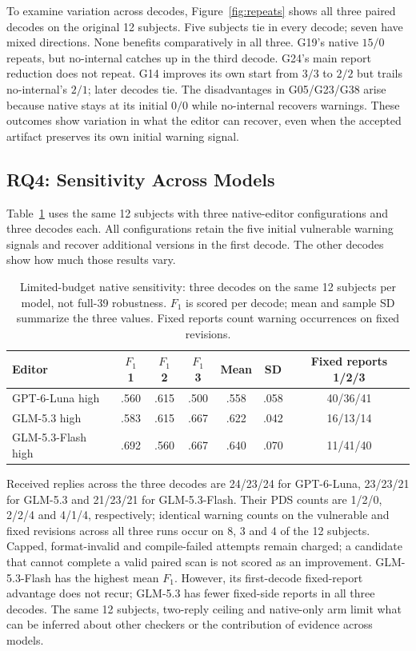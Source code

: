 To examine variation across decodes, Figure~\ref{fig:repeats} shows all three paired decodes on the original 12 subjects.
Five subjects tie in every decode; seven have mixed directions.
None benefits comparatively in all three.
G19's native $15/0$ repeats, but no-internal catches up in the third decode.
G24's main report reduction does not repeat.
G14 improves its own start from $3/3$ to $2/2$ but trails no-internal's $2/1$; later decodes tie.
The disadvantages in G05/G23/G38 arise because native stays at its initial $0/0$ while no-internal recovers warnings.
These outcomes show variation in what the editor can recover, even when the accepted artifact preserves its own initial warning signal.

\subsection{RQ4: Sensitivity Across Models}

Table~\ref{tab:models39} uses the same 12 subjects with three native-editor configurations and three decodes each.
All configurations retain the five initial vulnerable warning signals and recover additional versions in the first decode.
The other decodes show how much those results vary.

\begin{table}[!htbp]
\centering
\caption{Limited-budget native sensitivity: three decodes on the same 12 subjects per model, not full-39 robustness. $F_1$ is scored per decode; mean and sample SD summarize the three values. Fixed reports count warning occurrences on fixed revisions.}
\label{tab:models39}
\begingroup\FTTableSetup
\begin{tabular}{l|ccc|cc|c}
\hline\hline
\rule{0pt}{10.2bp}Editor & $F_1$ 1 & $F_1$ 2 & $F_1$ 3 & Mean & SD & Fixed reports 1/2/3\\
\hline
GPT-6-Luna high &.560&.615&.500&.558&.058&40/36/41\\\hline
GLM-5.3 high &.583&.615&.667&.622&.042&16/13/14\\\hline
GLM-5.3-Flash high &.692&.560&.667&.640&.070&11/41/40\\
\hline\hline
\end{tabular}
\endgroup
\end{table}

Received replies across the three decodes are 24/23/24 for GPT-6-Luna, 23/23/21 for GLM-5.3 and 21/23/21 for GLM-5.3-Flash.
Their PDS counts are 1/2/0, 2/2/4 and 4/1/4, respectively; identical warning counts on the vulnerable and fixed revisions across all three runs occur on 8, 3 and 4 of the 12 subjects.
Capped, format-invalid and compile-failed attempts remain charged; a candidate that cannot complete a valid paired scan is not scored as an improvement.
GLM-5.3-Flash has the highest mean $F_1$. However, its first-decode fixed-report advantage does not recur; GLM-5.3 has fewer fixed-side reports in all three decodes.
The same 12 subjects, two-reply ceiling and native-only arm limit what can be inferred about other checkers or the contribution of evidence across models.

